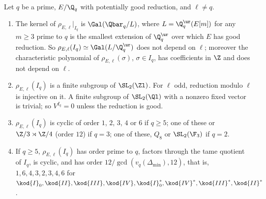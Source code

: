 \begin{theorem}\label{thm:galrep:serre-tate}
Let $q$ be a prime, $E/\Q_q$ with potentially good reduction, and $\ell\ne q$.
\begin{enumerate}[label=(\roman*)]
\item The kernel of $\rho_{E,\ell}|_{I_q}$ is $\Gal(\Qbar_q/L)$, where $L=\Q_q^{\ur}(E[m])$ for any $m\ge3$ prime to $q$ is the smallest extension of $\Q_q^{\ur}$
over which $E$ has good reduction. So $\rho_{E,\ell}(I_q)\simeq\Gal(L/\Q_q^{\ur})$ does not depend on $\ell$; moreover the characteristic polynomial of
$\rho_{E,\ell}(\sigma)$, $\sigma\in I_q$, has coefficients in $\Z$ and does not depend on $\ell$.
\item $\rho_{E,\ell}(I_q)$ is a finite subgroup of $\SL_2(\Zl)$. For $\ell$ odd, reduction modulo $\ell$ is injective on it. A finite subgroup of $\SL_2(\Ql)$
with a nonzero fixed vector is trivial; so $V^{I_q}=0$ unless the reduction is good.
\item $\rho_{E,\ell}(I_q)$ is cyclic of order $1$, $2$, $3$, $4$ or $6$ if $q\ge5$; one of these or $\Z/3\rtimes\Z/4$ (order $12$) if $q=3$; one of these,
$Q_8$ or $\SL_2(\F_3)$ if $q=2$.
\item If $q\ge5$, $\rho_{E,\ell}(I_q)$ has order prime to $q$, factors through the tame quotient of $I_q$, is cyclic, and has order
$12/\gcd(v_q(\Delta_{\min}),12)$, that is, $1,6,4,3,2,3,4,6$ for $\kod{I}_0,\kod{II},\kod{III},\kod{IV},\kod{I}_0^*,\kod{IV}^*,\kod{III}^*,\kod{II}^*$.
\end{enumerate}
\end{theorem}


